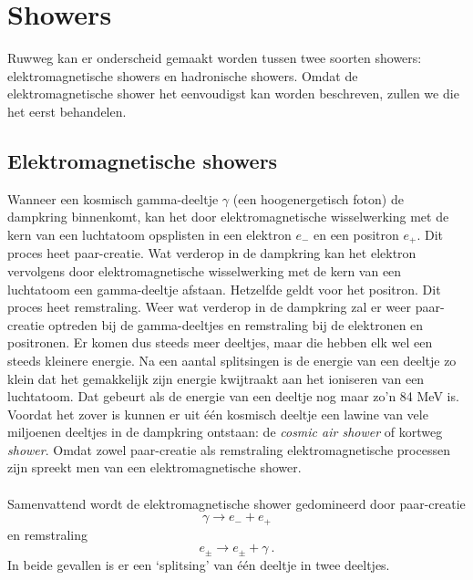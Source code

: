 \section{Showers}
Ruwweg kan er onderscheid gemaakt worden tussen twee soorten showers: elektromagnetische showers en hadronische showers. Omdat de elektromagnetische shower het eenvoudigst kan worden beschreven, zullen we die het eerst behandelen. 

\subsection{Elektromagnetische showers}
Wanneer een kosmisch gamma-deeltje $\gamma$ (een hoogenergetisch foton) de dampkring binnenkomt, kan het door elektromagnetische wisselwerking met de kern van een luchtatoom opsplisten in een elektron $e_{-}$ en een positron $e_{+}$. Dit proces heet paar-creatie. Wat verderop in de dampkring kan het elektron vervolgens door elektromagnetische wisselwerking met de kern van een luchtatoom een gamma-deeltje afstaan. Hetzelfde geldt voor het positron. Dit proces heet remstraling. Weer wat verderop in de dampkring zal er weer paar-creatie optreden bij de gamma-deeltjes en remstraling bij de elektronen en positronen. Er komen dus steeds meer deeltjes, maar die hebben elk wel een steeds kleinere energie. Na een aantal splitsingen is de energie van een deeltje zo klein dat het gemakkelijk zijn energie kwijtraakt aan het ioniseren van een luchtatoom. Dat gebeurt als de energie van een deeltje nog maar zo'n 84 MeV is. Voordat het zover is kunnen er uit \'e\'en kosmisch deeltje een lawine van vele miljoenen deeltjes in de dampkring ontstaan: de \emph{cosmic air shower} of kortweg \emph{shower}. Omdat zowel paar-creatie als remstraling elektromagnetische processen zijn spreekt men van een elektromagnetische shower. 
\\ \\
Samenvattend wordt de elektromagnetische shower gedomineerd door paar-creatie
\begin{equation}
\gamma \rightarrow e_{-} + e_{+} \nonumber
\end{equation}
en remstraling
\begin{equation} 
e_{\pm} \rightarrow e_{\pm} + \gamma \ . \nonumber
\end{equation}
In beide gevallen is er een `splitsing' van \'e\'en deeltje in twee deeltjes.  

